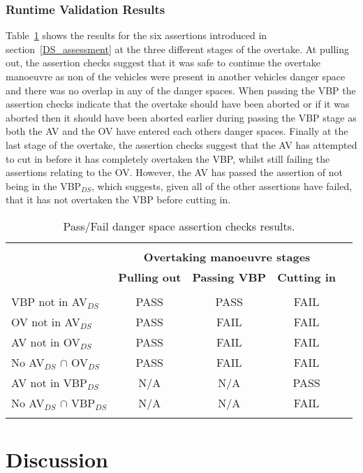 \subsubsection{Runtime Validation Results}
Table~\ref{Overtaking_DS_table} shows the results for the six assertions introduced in section~\ref{DS_assessment} at the three different stages of the overtake. At pulling out, the assertion checks suggest that it was safe to continue the overtake manoeuvre as non of the vehicles were present in another vehicles danger space and there was no overlap in any of the danger spaces. 
When passing the VBP the assertion checks indicate that the overtake should have been aborted or if it was aborted then it should have been aborted earlier during passing the VBP stage as both the AV and the OV have entered each others danger spaces. Finally at the last stage of the overtake, the assertion checks suggest that the AV has attempted to cut in before it has completely overtaken the VBP, whilst still failing the assertions relating to the OV. However, the AV has passed the assertion of not being in the VBP$_{DS}$, which suggests, given all of the other assertions have failed, that it has not overtaken the VBP before cutting in.

\begin{table}[h]
\centering
\begin{tabular}{ lcccc }
\hline
\\
\multirow{3}{*}{\textbf{}} & \multicolumn{3}{c}{\textbf{Overtaking manoeuvre stages}}\\
\textbf{Assertion} & \textbf{Pulling out} & \textbf{Passing VBP} & \textbf{Cutting in} & \\
&  &  &  & \\
VBP not in AV$_{DS}$ & PASS & PASS & FAIL\\
%
OV not in AV$_{DS}$ & PASS & FAIL & FAIL\\
%
AV not in OV$_{DS}$  & PASS & FAIL & FAIL\\
%
No AV$_{DS}$ $\cap$ OV$_{DS}$  & PASS & FAIL & FAIL\\
%
AV not in VBP$_{DS}$  & N/A & N/A & PASS\\
%
No AV$_{DS}$ $\cap$ VBP$_{DS}$  & N/A & N/A & FAIL\\
%
\\
\hline
\end{tabular}
\caption{Pass/Fail danger space assertion checks results.} \label{Overtaking_DS_table}
\end{table}

\section{Discussion} \label{discussion}

